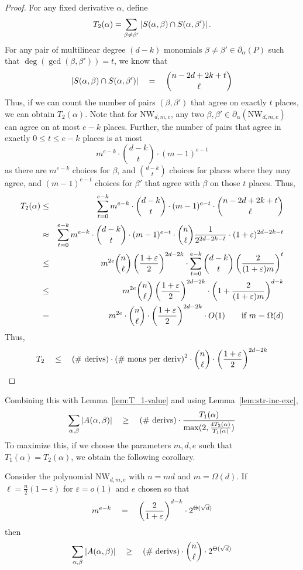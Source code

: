 \documentclass{beatcs}
\newcommand{\NW}{\mathrm{NW}}
\newcommand{\spaced}[1]{\quad#1\quad}
\renewcommand{\epsilon}{\varepsilon}
\begin{document}
\begin{proof}
For any fixed derivative $\alpha$, define \[T_2(\alpha) = \sum_{\beta\neq \beta'}\left|S(\alpha, \beta)\cap S(\alpha, \beta')\right|.\] 
For any pair of multilinear degree $(d-k)$ monomials $\beta \neq \beta' \in \partial_\alpha(P)$ such that $\deg(\gcd(\beta, \beta')) = t$, we know that 
\[
\abs{S(\alpha, \beta)\intersection S(\alpha, \beta')} \spaced{=} \binom{n - 2d + 2k +t}{\ell}
\]
Thus, if we can count the number of pairs $(\beta, \beta')$ that agree on exactly $t$ places, we can obtain $T_2(\alpha)$. Note that for $\NW_{d,m,e}$, any two $\beta, \beta' \in\partial_\alpha(\NW_{d,m,e})$ can agree on at most $e-k$ places. Further, the number of pairs that agree in exactly $0\leq t\leq e-k$ places is at most
\[
m^{e-k} \cdot \binom{d-k}{t} \cdot (m-1)^{e-t}
\]
as there are $m^{e-k}$ choices for $\beta$, and $\binom{d-k}{t}$ choices for places where they may agree, and $(m-1)^{e-t}$ choices for $\beta'$ that agree with $\beta$ on those $t$ places. Thus,
\begin{eqnarray*}
T_2(\alpha) &\leq& \sum_{t=0}^{e-k} m^{e-k} \cdot \binom{d-k}{t} \cdot (m-1)^{e-t} \cdot  \binom{n - 2d + 2k +t}{\ell}\\
& \approx  & \sum_{t=0}^{e-k} m^{e-k} \cdot \binom{d-k}{t} \cdot (m-1)^{e-t} \cdot  \binom{n}{\ell} \frac{1}{2^{2d-2k -t}}\cdot (1+\epsilon)^{2d - 2k - t}\\
& \leq & m^{2e}\binom{n}{\ell}\inparen{\frac{1+\epsilon}{2}}^{2d -2k}\cdot\sum_{t=0}^{e-k}\binom{d-k}{t}\inparen{\frac{2}{(1+\epsilon)m}}^t\\
& \leq & m^{2e}\binom{n}{\ell}\inparen{\frac{1+\epsilon}{2}}^{2d -2k}\cdot \inparen{1+\frac{2}{(1+\epsilon)m}}^{d-k}\\
& = & m^{2e}\cdot \binom{n}{\ell} \cdot \inparen{\frac{1+\epsilon}{2}}^{2d -2k}\cdot O(1) \qquad\text{if $m = \Omega(d)$}
\end{eqnarray*}
Thus,
\[
T_2 \quad \leq \quad\text{(\# derivs)} \cdot \text{(\# mons per deriv)}^2\cdot \binom{n}{\ell} \cdot \inparen{\frac{1+\epsilon}{2}}^{2d -2k}
\]
\end{proof}
Combining this with Lemma~\ref{lem:T_1-value} and using Lemma~\ref{lem:str-inc-exc},
\[
\sum_{\alpha,\beta}\abs{A(\alpha, \beta)} \spaced{\geq} \text{(\# derivs)}\cdot \frac{T_1(\alpha)}{\max(2, \frac{4T_2(\alpha)}{T_1(\alpha)})}
\]
To maximize this, if we choose the parameters $m,d,e$ such that $T_1(\alpha) = T_2(\alpha)$, we obtain the following corollary. 
\begin{corollary}\label{cor:T2-bound}
Consider the polynomial $\NW_{d,m,e}$ with $n = md$ and $m = \Omega(d)$. If $\ell = \frac{n}{2}(1 - \epsilon)$ for $\epsilon = o(1)$ and $e$ chosen so that
\[
m^{e-k} \quad = \quad \inparen{\frac{2}{1+\epsilon}}^{d-k} \cdot 2^{\Theta(\sqrt{d})}
\]
then
\[
\sum_{\alpha, \beta}\abs{A(\alpha, \beta)} \spaced{\geq} \text{(\# derivs)}\cdot  \binom{n}{\ell} \cdot 2^{\Theta(\sqrt{d})}
\]
\end{corollary}
\end{document}
